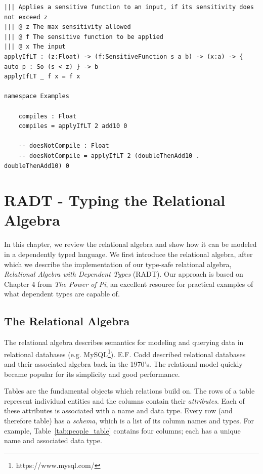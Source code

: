 \documentclass[12pt]{report}
\begin{document}
\begin{lstlisting}[float,caption={Sensitivity-aware function application},label={lst:sens_app}]
||| Applies a sensitive function to an input, if its sensitivity does not exceed z
||| @ z The max sensitivity allowed
||| @ f The sensitive function to be applied
||| @ x The input
applyIfLT : (z:Float) -> (f:SensitiveFunction s a b) -> (x:a) -> { auto p : So (s < z) } -> b
applyIfLT _ f x = f x

namespace Examples

    compiles : Float
    compiles = applyIfLT 2 add10 0

    -- doesNotCompile : Float
    -- doesNotCompile = applyIfLT 2 (doubleThenAdd10 . doubleThenAdd10) 0
\end{lstlisting}

\chapter{RADT - Typing the Relational Algebra}\label{sec:RADT}

In this chapter, we review the relational algebra and show how it can be modeled in a dependently typed language.
We first introduce the relational algebra, after which we describe the implementation of our type-safe relational algebra, \textit{Relational Algebra with Dependent Types} (RADT).
Our approach is based on Chapter 4 from \textit{The Power of Pi}\cite{OurySwierstra08PowerOfPi}, an excellent resource for practical examples of what dependent types are capable of.

\section{The Relational Algebra}

The relational algebra describes semantics for modeling and querying data in relational databases (e.g. MySQL\footnote{https://www.mysql.com/}).
E.F. Codd described relational databases and their associated algebra back in the 1970's\cite{codd70}.
The relational model quickly became popular for its simplicity and good performance.

Tables are the fundamental objects which relations build on.
The rows of a table represent individual entities and the columns contain their \textit{attributes}.
Each of these attributes is associated with a name and data type.
Every row (and therefore table) has a \textit{schema}, which is a list of its column names and types.
For example, Table~\ref{tab:people_table} contains four columns; each has a unique name and associated data type.
\end{document}
